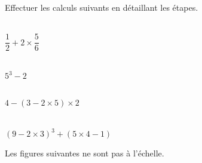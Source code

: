
Effectuer les calculs suivants en détaillant les étapes.

\begin{multicols}{4}
    \cnt\\ 
    $\dfrac{1}{2}+2\times\dfrac{5}{6}$

    \cnt\\
      $5^3-2$

    \cnt\\
    $4-(3-2\times 5)\times 2$

    \cnt\\
      $(9-2\times 3)^3+(5\times 4-1)$
\end{multicols}


Les figures suivantes ne sont pas à l'échelle. 

